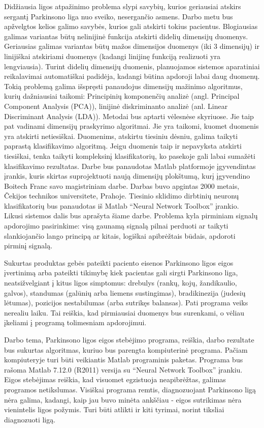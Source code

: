 \documentclass[]{vgtuef}
\begin{document}
Didžiausia ligos atpažinimo problema slypi savybių, kurios geriausiai atskirs sergantį Parkinsono liga nuo sveiko, nesergančio asmens. Darbo metu bus apžvelgtos kelios galimo savybės, kurios gali atskirti tokius pacientus. Blogiausias galimas variantas būtų nelinijinė funkcija atskirti didelių dimensijų duomenys. Geriausias galimas variantas būtų mažos dimensijos duomenys (iki 3 dimensijų) ir linijiškai atskiriami duomenys (kadangi linijinę funkciją realizuoti yra lengviausia). Turint didelių dimensijų duomenis, planuojamos sistemos aparatiniai reikalavimai automatiškai padidėja, kadangi būtina apdoroji labai daug duomenų. Tokią problemą galima išspręsti panaudojus dimensijų mažinimo algoritmus, kurių dažniausiai taikomi: Principinių komponenčių analizė (angl. Principal Component Analysis (PCA)), linijinė diskriminanto analizė (anl. Linear Discriminant Analysis (LDA)). Metodai bus aptarti vėlesnėse skyriuose. Jie taip pat vadinami dimensijų praskyrimo algoritmai. Jie yra taikomi, kuomet duomenis yra atskirti netiesiškai. Duomenims, atskirtu tiesiniu dėsniu, galima taikyti paprastą klasifikavimo algoritmą. Jeigu duomenis taip ir nepavyksta atskirti tiesiškai, tenka taikyti kompleksinį klasifikatorių, ko pasekoje gali labai sumažėti klasifikavimo rezultatas. Darbe bus panaudotas Matlab platformoje įgyvendintas įrankis, kuris skirtas suprojektuoti naują dimensijų plokštumą, kurį įgyvendino Boitech Franc savo magistriniam darbe. Darbas buvo apgintas 2000 metais, Čekijos technikos universitete, Prahoje. Tiesinio sklidimo dirbtinių neuronų klasifikatorių bus panaudotas iš Matlab ``Neural Network Toolbox'' įrankio. Likusi sistemos dalis bus aprašyta šiame darbe. Problema kyla pirminiam signalų apdorojimo pasirinkime: visą gaunamą signalą pilnai perduoti ar taikyti slankiojančio lango principą ar kitais, logiškai apibrėžtais būdais, apdoroti pirminį signalą.

Sukurtas produktas gebės pateikti paciento eisenos Parkinsono ligos eigos įvertinimą arba pateikti tikimybę kiek pacientas gali sirgti Parkinsono liga, neatsižvelgiant į kitus ligos simptomus: drebulys (rankų, kojų, žandikaulio, galvos), standumas (galūnių arba liemens sustingimas), bradikinezija (judesių lėtumas), pozicijos nestabilumas (arba sutrikęs balansas). Pati programa veiks nerealiu laiku. Tai reiškia, kad pirmiausiai duomenys bus surenkami, o vėliau įkeliami į programą tolimesniam apdorojimui.

Darbo tema, Parkinsono ligos eigos stebėjimo programa, reiškia, darbo rezultate bus sukurtas algoritmas, kuriuo bus parengta kompiuterinė programa. Pačiam kompiuteryje turi būti veikiantis Matlab programinis paketas. Programa bus rašoma Matlab 7.12.0 (R2011) versija su ``Neural Network Toolbox'' įrankiu. Eigos stebėjimas reiškia, kad visuomet egzistuoja neapibrėžtas, galimas programos netikslumas. Visiškai programa remtis, diagnozuojant Parkinsono ligą nėra galima, kadangi, kaip jau buvo minėta ankščiau - eigos sutrikimas nėra vienintelis ligos požymis. Turi būti atlikti ir kiti tyrimai, norint tiksliai diagnozuoti ligą.
\end{document}
